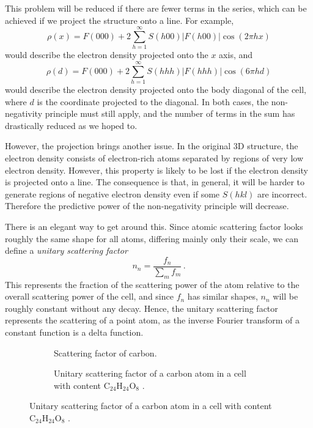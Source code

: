 \documentclass{article}
\theoremstyle{plain}\theoremheaderfont{\normalfont\itshape}\theorembodyfont{\rmfamily}\theoremseparator{.}\newtheorem*{rem}{Remark}\newtheorem*{ex}{Example}\newtheorem*{proof}{Proof}\newtheorem*{altp}{Alternative proof}
\theoremstyle{plain}\theoremheaderfont{\normalfont\bfseries}\theorembodyfont{\rmfamily}\theoremseparator{.}\newtheorem{thm}{Theorem}[section]\newtheorem{lem}[thm]{Lemma}\newtheorem{prop}[thm]{Proposition}\newtheorem*{cor}{Corollary}\newtheorem{defn}[thm]{Definition}\newtheorem{clm}[thm]{Claim}\newtheorem{clminproof}{Claim}\newtheorem*{law}{Law}\newtheorem{pos}[thm]{Postulate}
\theoremstyle{break}\theoremheaderfont{\normalfont\itshape}\theorembodyfont{\rmfamily}\theoremseparator{.\medskip}\newtheorem*{proofskip}{Proof}\newtheorem*{exs}{Examples}\newtheorem*{rems}{Remarks}
\theoremstyle{break}\theoremheaderfont{\normalfont\bfseries}\theorembodyfont{\rmfamily}\theoremseparator{.\medskip}\newtheorem{lemskip}[thm]{Lemma}\newtheorem{defnskip}[thm]{Definition}\newtheorem{propskip}[thm]{Proposition}\newtheorem{thmskip}[thm]{Theorem}
\numberwithin{equation}{section}
\newcommand{\abs}[1]{\left| #1 \right|}
\begin{document}
    This problem will be reduced if there are fewer terms in the series, which can be achieved if we project the structure onto a line. For example,
    \begin{equation}
        \rho(x)=F(000)+2\sum_{h=1}^{\infty}S(h00)\abs{F(h00)}\cos(2\pi hx)
    \end{equation}
    would describe the electron density projected onto the \(x\) axis, and
    \begin{equation}
        \rho(d)=F(000)+2\sum_{h=1}^{\infty}S(hhh)\abs{F(hhh)}\cos(6\pi hd)
    \end{equation}
    would describe the electron density projected onto the body diagonal of the cell, where \(d\) is the coordinate projected to the diagonal. In both cases, the non-negativity principle must still apply, and the number of terms in the sum has drastically reduced as we hoped to.

    However, the projection brings another issue. In the original 3D structure, the electron density consists of electron-rich atoms separated by regions of very low electron density. However, this property is likely to be lost if the electron density is projected onto a line. The consequence is that, in general, it will be harder to generate regions of negative electron density even if some \(S(hkl)\) are incorrect. Therefore the predictive power of the non-negativity principle will decrease.

    There is an elegant way to get around this. Since atomic scattering factor looks roughly the same shape for all atoms, differing mainly only their scale, we can define a \textit{unitary scattering factor}
    \begin{equation}
        n_n=\frac{f_n}{\sum_m f_m}\,.
    \end{equation}
    This represents the fraction of the scattering power of the atom relative to the overall scattering power of the cell, and since \(f_n\) has similar shapes, \(n_n\) will be roughly constant without any decay. Hence, the unitary scattering factor represents the scattering of a point atom, as the inverse Fourier transform of a constant function is a delta function.

    \begin{figure}
        \centering
        \begin{subfigure}[h]{0.45\linewidth}
            \begin{adjustbox}{width=\linewidth}
                
            \end{adjustbox}
            \caption{Scattering factor of carbon.}
        \end{subfigure}
        \hfill
        \begin{subfigure}[h]{0.45\linewidth}
            \begin{adjustbox}{width=\linewidth}
                
            \end{adjustbox}
            \caption{Unitary scattering factor of a carbon atom in a cell with content \(\mathrm{C_{24}H_{24}O_8}\) .}
        \end{subfigure}
    \end{figure}
\end{document}
